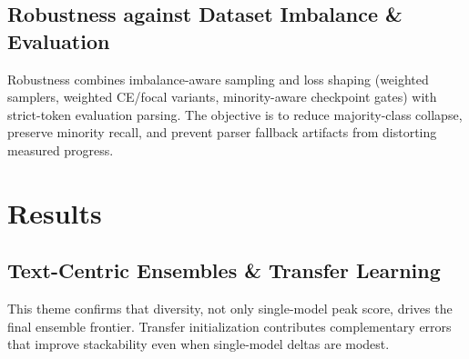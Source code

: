\documentclass[11pt,a4paper,twocolumn]{article}
\begin{document}
\subsection{Robustness against Dataset Imbalance \& Evaluation}
Robustness combines imbalance-aware sampling and loss shaping (weighted samplers, weighted CE/focal variants, minority-aware checkpoint gates) with strict-token evaluation parsing. The objective is to reduce majority-class collapse, preserve minority recall, and prevent parser fallback artifacts from distorting measured progress.

\section{Results}

\subsection{Text-Centric Ensembles \& Transfer Learning}
\begin{table}[htbp]
\centering
\small
{}
\caption{Text-centric ensembling and transfer-learning outcomes on MELD.}
\label{tab:text_transfer}
\end{table}

This theme confirms that diversity, not only single-model peak score, drives the final ensemble frontier. Transfer initialization contributes complementary errors that improve stackability even when single-model deltas are modest.
\end{document}
